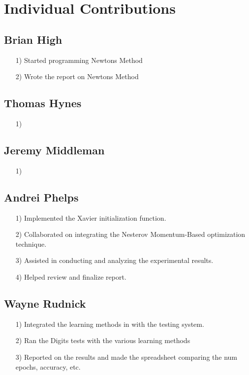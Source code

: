 \documentclass{article}
\begin{document}
\section{Individual Contributions}

\subsection*{Brian High}
\begin{itemize}
    \item[1)] Started programming Newtons Method
    \item[2)] Wrote the report on Newtons Method
\end{itemize}

\subsection*{Thomas Hynes}
\begin{itemize}
    \item[1)] 
\end{itemize}

\subsection*{Jeremy Middleman}
\begin{itemize}
    \item[1)] 
\end{itemize}

\subsection*{Andrei Phelps}
\begin{itemize}
    \item[1)] Implemented the Xavier initialization function.
    \item[2)] Collaborated on integrating the Nesterov Momentum-Based optimization technique.
    \item[3)] Assisted in conducting and analyzing the experimental results.
    \item[4)] Helped review and finalize report.
\end{itemize}

\subsection*{Wayne Rudnick}
\begin{itemize}
    \item[1)] Integrated the learning methods in with the testing system.
    \item[2)] Ran the Digits tests with the various learning methods
     \item[3)] Reported on the results and made the spreadsheet comparing the num epochs, accuracy, etc.
\end{itemize}
\end{document}
